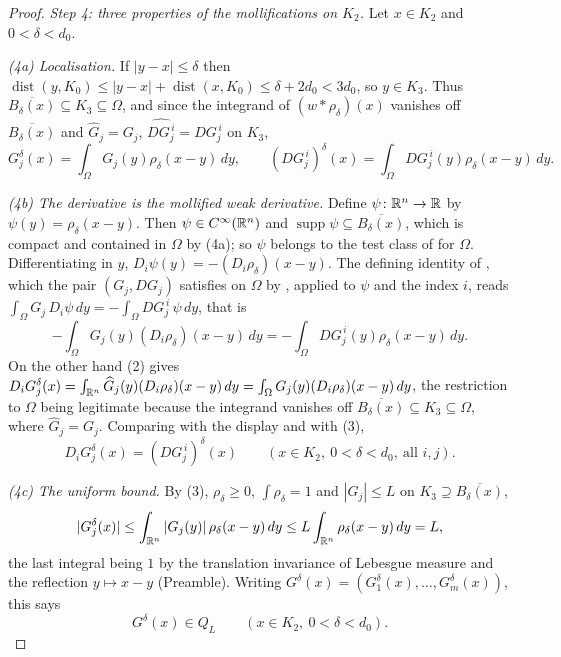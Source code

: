\begin{proof}
\emph{Step 4: three properties of the mollifications on $K_2$.}  Let
$x\in K_2$ and $0<\delta<d_0$.

\emph{(4a) Localisation.}  If $|y-x|\le\delta$ then
$\operatorname{dist}(y,K_0)\le|y-x|+\operatorname{dist}(x,K_0)\le\delta+2d_0<3d_0$,
so $y\in K_3$.  Thus $\overline{B_\delta(x)}\subseteq K_3\subseteq\Omega$, and
since the integrand of $(w*\rho_\delta)(x)$ vanishes off
$\overline{B_\delta(x)}$ and $\widehat G_j=G_j$, $\widehat{DG_j^{\,i}}=DG_j^{\,i}$
on $K_3$,
\[
G_j^\delta(x)=\int_\Omega G_j(y)\rho_\delta(x-y)\,dy,
\qquad
(DG_j^{\,i})^\delta(x)=\int_\Omega DG_j^{\,i}(y)\rho_\delta(x-y)\,dy .
\tag{3}
\]

\emph{(4b) The derivative is the mollified weak derivative.}  Define
$\psi\colon\mathbb{R}^n\to\mathbb{R}$ by $\psi(y)=\rho_\delta(x-y)$.  Then
$\psi\in C^\infty(\mathbb{R}^n)$ and
$\operatorname{supp}\psi\subseteq\overline{B_\delta(x)}$, which is compact and
contained in $\Omega$ by (4a); so $\psi$ belongs to the test class of
 for $\Omega$.  Differentiating in $y$,
$D_i\psi(y)=-(D_i\rho_\delta)(x-y)$.  The defining identity of
, which the pair $(G_j,DG_j)$ satisfies on $\Omega$
by , applied to $\psi$ and the index $i$, reads
$\int_\Omega G_j\,D_i\psi\,dy=-\int_\Omega DG_j^{\,i}\,\psi\,dy$, that is
\[
-\int_\Omega G_j(y)(D_i\rho_\delta)(x-y)\,dy
=-\int_\Omega DG_j^{\,i}(y)\rho_\delta(x-y)\,dy .
\]
On the other hand (2) gives
$D_iG_j^\delta(x)=\int_{\mathbb{R}^n}\widehat G_j(y)(D_i\rho_\delta)(x-y)\,dy
=\int_\Omega G_j(y)(D_i\rho_\delta)(x-y)\,dy$, the restriction to $\Omega$ being
legitimate because the integrand vanishes off
$\overline{B_\delta(x)}\subseteq K_3\subseteq\Omega$, where
$\widehat G_j=G_j$.  Comparing with the display and with (3),
\[
D_iG_j^\delta(x)=(DG_j^{\,i})^\delta(x)
\qquad(x\in K_2,\ 0<\delta<d_0,\ \text{all }i,j).
\tag{4}
\]

\emph{(4c) The uniform bound.}  By (3), $\rho_\delta\ge0$,
$\int\rho_\delta=1$ and $|G_j|\le L$ on $K_3\supseteq\overline{B_\delta(x)}$,
\[
|G_j^\delta(x)|\le\int_{\mathbb{R}^n}|G_j(y)|\,\rho_\delta(x-y)\,dy
\le L\int_{\mathbb{R}^n}\rho_\delta(x-y)\,dy=L ,
\]
the last integral being $1$ by the translation invariance of Lebesgue measure
and the reflection $y\mapsto x-y$ (Preamble).  Writing
$G^\delta(x)=(G_1^\delta(x),\dots,G_m^\delta(x))$, this says
\[
G^\delta(x)\in Q_L\qquad(x\in K_2,\ 0<\delta<d_0).
\tag{5}
\]


\end{proof}
